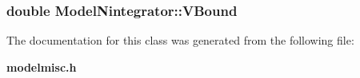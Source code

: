 \subsubsection{\setlength{\rightskip}{0pt plus 5cm}double Model\-Nintegrator::VBound}\label{class_ModelNintegrator_m1}




The documentation for this class was generated from the following file:\begin{CompactItemize}
\item 
{\bf modelmisc.h}\end{CompactItemize}
